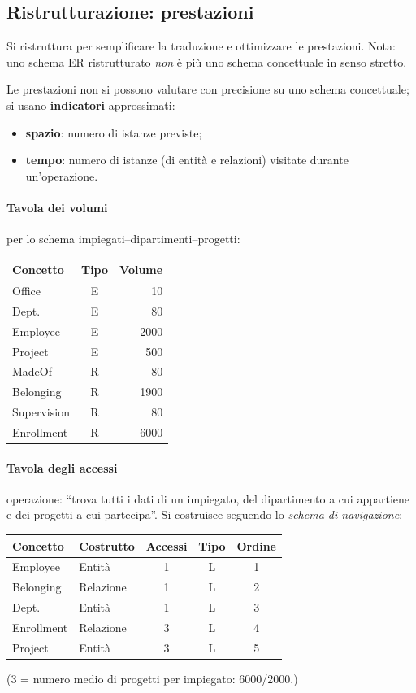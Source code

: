 \documentclass[a4paper,12pt]{article}
\begin{document}
\subsection{Ristrutturazione: prestazioni}

Si ristruttura per semplificare la traduzione e ottimizzare le prestazioni.
Nota: uno schema ER ristrutturato \emph{non} è più uno schema concettuale in
senso stretto.

Le prestazioni non si possono valutare con precisione su uno schema
concettuale; si usano \textbf{indicatori} approssimati:
\begin{itemize}
  \item \textbf{spazio}: numero di istanze previste;
  \item \textbf{tempo}: numero di istanze (di entità e relazioni) visitate
    durante un'operazione.
\end{itemize}

\paragraph{Tavola dei volumi} per lo schema impiegati--dipartimenti--progetti:
\begin{center}
\begin{tabular}{|l|c|r|}
\hline
\textbf{Concetto} & \textbf{Tipo} & \textbf{Volume}\\ \hline
Office & E & 10\\ Dept. & E & 80\\ Employee & E & 2000\\ Project & E & 500\\
MadeOf & R & 80\\ Belonging & R & 1900\\ Supervision & R & 80\\
Enrollment & R & 6000\\ \hline
\end{tabular}
\end{center}

\paragraph{Tavola degli accessi} operazione: ``trova tutti i dati di un
impiegato, del dipartimento a cui appartiene e dei progetti a cui
partecipa''. Si costruisce seguendo lo \emph{schema di navigazione}:
\begin{center}
\begin{tabular}{|l|l|c|c|c|}
\hline
\textbf{Concetto} & \textbf{Costrutto} & \textbf{Accessi} & \textbf{Tipo} & \textbf{Ordine}\\ \hline
Employee & Entità & 1 & L & 1\\
Belonging & Relazione & 1 & L & 2\\
Dept. & Entità & 1 & L & 3\\
Enrollment & Relazione & 3 & L & 4\\
Project & Entità & 3 & L & 5\\ \hline
\end{tabular}
\end{center}
(3 = numero medio di progetti per impiegato: 6000/2000.)
\end{document}
